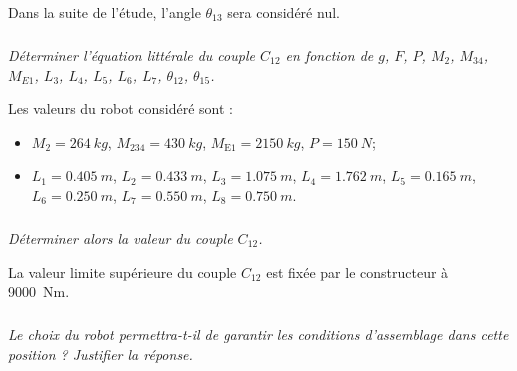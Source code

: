 Dans la suite de l'étude, l'angle $\theta_{13}$ sera considéré nul.

\subparagraph{}\textit{Déterminer l'équation littérale du couple $C_{12}$ en fonction de $g$, $F$, $P$, $M_2$, $M_{34}$, $M_{E1}$, $L_3$, $L_4$, $L_5$, $L_6$, $L_7$, $\theta_{12}$, $\theta_{15}$.}

Les valeurs du robot considéré sont :
\begin{itemize}
\item $M_{2}=\SI{264}{kg}$, $M_{234}=\SI{430}{kg}$, $M_{\text{E1}}=\SI{2150}{kg}$, $P=\SI{150}{N}$;
\item $L_{1}=\SI{0,405}{m}$, $L_{2}=\SI{0,433}{m}$, $L_{3}=\SI{1,075}{m}$, $L_{4}=\SI{1,762}{m}$, $L_{5}=\SI{0,165}{m}$, $L_{6}=\SI{0,250}{m}$, $L_{7}=\SI{0,550}{m}$, $L_{8}=\SI{0,750}{m}$.
\end{itemize}

\subparagraph{}\textit{Déterminer alors la valeur du couple $C_{12}$.}

La valeur limite supérieure du couple $C_{12}$ est fixée par le constructeur à \SI{9000}{Nm}.
\subparagraph{}\textit{Le choix du robot permettra-t-il de garantir les conditions d'assemblage dans cette position ? Justifier la réponse. }
